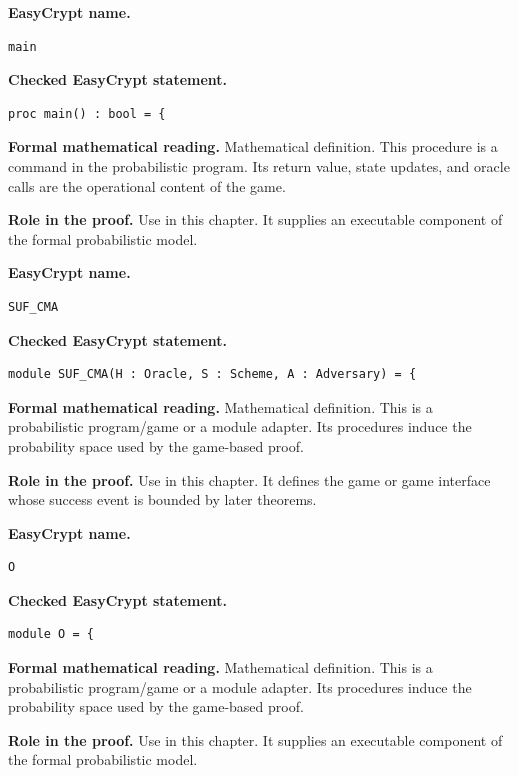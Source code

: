 \begin{formaldefinition}
\noindent\textbf{EasyCrypt name.}
\begin{lstlisting}[language=EasyCrypt,basicstyle=\ttfamily\scriptsize]
main
\end{lstlisting}
\noindent\textbf{Checked EasyCrypt statement.}
\begin{lstlisting}[language=EasyCrypt,basicstyle=\ttfamily\scriptsize]
proc main() : bool = {
\end{lstlisting}
\noindent\textbf{Formal mathematical reading.}
Mathematical definition. This procedure is a command in the probabilistic program.  Its return value, state updates, and oracle calls are the operational content of the game.

\noindent\textbf{Role in the proof.}
Use in this chapter. It supplies an executable component of the formal probabilistic model.

\end{formaldefinition}

\begin{formaldefinition}
\noindent\textbf{EasyCrypt name.}
\begin{lstlisting}[language=EasyCrypt,basicstyle=\ttfamily\scriptsize]
SUF_CMA
\end{lstlisting}
\noindent\textbf{Checked EasyCrypt statement.}
\begin{lstlisting}[language=EasyCrypt,basicstyle=\ttfamily\scriptsize]
module SUF_CMA(H : Oracle, S : Scheme, A : Adversary) = {
\end{lstlisting}
\noindent\textbf{Formal mathematical reading.}
Mathematical definition. This is a probabilistic program/game or a module adapter.  Its procedures induce the probability space used by the game-based proof.

\noindent\textbf{Role in the proof.}
Use in this chapter. It defines the game or game interface whose success event is bounded by later theorems.

\end{formaldefinition}

\begin{formaldefinition}
\noindent\textbf{EasyCrypt name.}
\begin{lstlisting}[language=EasyCrypt,basicstyle=\ttfamily\scriptsize]
O
\end{lstlisting}
\noindent\textbf{Checked EasyCrypt statement.}
\begin{lstlisting}[language=EasyCrypt,basicstyle=\ttfamily\scriptsize]
module O = {
\end{lstlisting}
\noindent\textbf{Formal mathematical reading.}
Mathematical definition. This is a probabilistic program/game or a module adapter.  Its procedures induce the probability space used by the game-based proof.

\noindent\textbf{Role in the proof.}
Use in this chapter. It supplies an executable component of the formal probabilistic model.

\end{formaldefinition}


